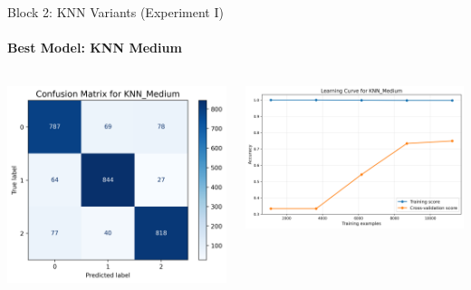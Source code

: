 \documentclass[9pt]{beamer}
\begin{document}
    \begin{frame}{Block 2: KNN Variants (Experiment I)}
    \framesubtitle{Best Model: KNN Medium}
    \begin{columns}
        \begin{column}{0.33\textwidth}
            \centering
            \includegraphics[width=\textwidth]{code/ResultsMainAugZip/plots/Block2_KNN_Variants_Experiment_I/confusion_matrix_KNN_Medium.png}
        \end{column}
        \begin{column}{0.33\textwidth}
            \centering
            \includegraphics[width=\textwidth]{code/ResultsMainAugZip/plots/Block2_KNN_Variants_Experiment_I/learning_curve_KNN_Medium.png}

\end{column}
\end{columns}
\end{frame}
\end{document}
